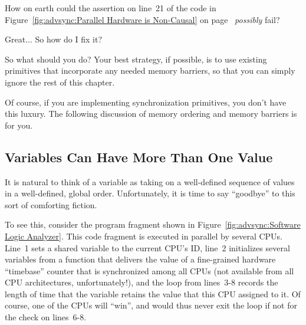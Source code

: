 \QuickQuiz{}
	How on earth could the assertion on line~21 of the code in
	Figure~\ref{fig:advsync:Parallel Hardware is Non-Causal} on
	page~\pageref{fig:advsync:Parallel Hardware is Non-Causal}
	\emph{possibly} fail?
 \QuickQuizEnd

\QuickQuiz{}
	Great...  So how do I fix it?
 \QuickQuizEnd

So what should you do?
Your best strategy, if possible, is to use existing primitives that
incorporate any needed memory barriers, so that you can simply ignore
the rest of this chapter.

Of course, if you are implementing synchronization primitives,
you don't have this luxury.
The following discussion of memory ordering and memory barriers
is for you.

\subsection{Variables Can Have More Than One Value}
\label{sec:advsync:Variables Can Have More Than One Value}

It is natural to think of a variable as taking on a well-defined
sequence of values in a well-defined, global order.
Unfortunately, it is time to say ``goodbye'' to this sort of comforting
fiction.

To see this, consider the program fragment shown in
Figure~\ref{fig:advsync:Software Logic Analyzer}.
This code fragment is executed in parallel by several CPUs.
Line~1 sets a shared variable to the current CPU's ID, line~2
initializes several variables from a  function that
delivers the value of a fine-grained hardware ``timebase'' counter that is
synchronized among all CPUs (not available from all CPU architectures,
unfortunately!), and the loop from lines~3-8 records the length of
time that the variable retains the value that this CPU assigned to it.
Of course, one of the CPUs will ``win'', and would thus never exit
the loop if not for the check on lines~6-8.

